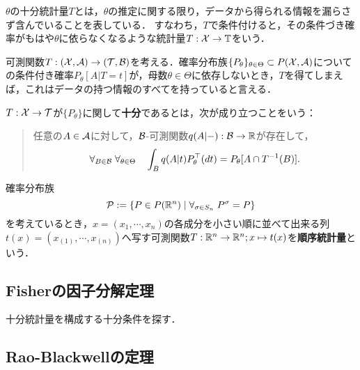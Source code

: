 \documentclass[uplatex,dvipdfmx]{jsreport}
\begin{document}
\begin{tcolorbox}[colframe=ForestGreen, colback=ForestGreen!10!white,breakable,colbacktitle=ForestGreen!40!white,coltitle=black,fonttitle=\bfseries\sffamily,
title=]
    $\theta$の十分統計量$T$とは，$\theta$の推定に関する限り，データから得られる情報を漏らさず含んでいることを表している．
    すなわち，$T$で条件付けると，その条件づき確率がもはや$\theta$に依らなくなるような統計量$T:\mathcal{X}\to\mathbb{T}$をいう．
\end{tcolorbox}

\begin{notation}
    可測関数$T:(\mathcal{X},\mathcal{A})\to(\mathcal{T},\mathcal{B})$を考える．確率分布族$\{P_\theta\}_{\theta\in\Theta}\subset P(\mathcal{X},\mathcal{A})$についての条件付き確率$P_\theta[A|T=t]$が，母数$\theta\in\Theta$に依存しないとき，$T$を得てしまえば，これはデータの持つ情報のすべてを持っていると言える．
\end{notation}

\begin{definition}
    $T:\mathcal{X}\to\mathcal{T}$が$\{P_\theta\}$に関して\textbf{十分}であるとは，次が成り立つことをいう：
    \begin{quote}
        任意の$A\in\mathcal{A}$に対して，$\mathcal{B}$-可測関数$q(A|-):\mathcal{B}\to\mathbb{R}$が存在して，
        \[\forall_{B\in\mathcal{B}}\;\forall_{\theta\in\Theta}\quad\int_Bq(A|t)P_\theta^\top(dt)=P_\theta[A\cap T^{-1}(B)].\]
    \end{quote}
\end{definition}

\begin{example}
    確率分布族
    \[\mathcal{P}:=\left\{P\in P(\mathbb{R}^n)\mid\forall_{\sigma\in S_n}\;P^\sigma=P\right\}\]
    を考えているとき，$x=(x_1,\cdots,x_n)$の各成分を小さい順に並べて出来る列$t(x)=(x_{(1)},\cdots,x_{(n)})$へ写す可測関数$T:\mathbb{R}^n\to\mathbb{R}^n;x\mapsto t(x)$を\textbf{順序統計量}という．
\end{example}

\subsection{Fisherの因子分解定理}

\begin{tcolorbox}[colframe=ForestGreen, colback=ForestGreen!10!white,breakable,colbacktitle=ForestGreen!40!white,coltitle=black,fonttitle=\bfseries\sffamily,
title=]
    十分統計量を構成する十分条件を探す．
\end{tcolorbox}

\subsection{Rao-Blackwellの定理}
\end{document}
